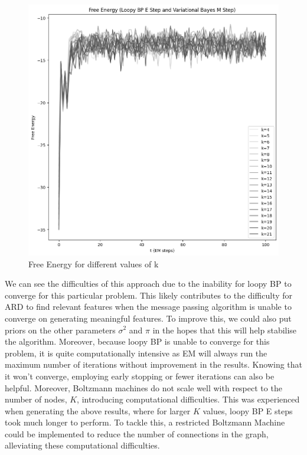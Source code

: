 \documentclass[12pt]{article}
\begin{document}
\begin{figure}[h]
\centering
\includegraphics[scale=0.4]{outputs/q5/d-free-energy}
\caption{Free Energy for different values of k}
\label{fig:}
\end{figure}

We can see the difficulties of this approach due to the inability for loopy BP to converge for this particular problem.
This likely contributes to the difficulty for ARD to find relevant features when the message passing algorithm is unable to converge on generating meaningful features.
To improve this, we could also put priors on the other parameters $\sigma^2$ and $\pi$ in the hopes that this will help stabilise the algorithm.
Moreover, because loopy BP is unable to converge for this problem, it is quite computationally intensive as EM will always run the maximum number of iterations without improvement in the results.
Knowing that it won't converge, employing early stopping or fewer iterations can also be helpful.
Moreover, Boltzmann machines do not scale well with respect to the number of nodes, $K$, introducing computational difficulties.
This was experienced when generating the above results, where for larger $K$ values, loopy BP E steps took much longer to perform. To tackle this, a restricted Boltzmann Machine could be implemented to reduce the number of connections in the graph, alleviating these computational difficulties.
\end{document}
